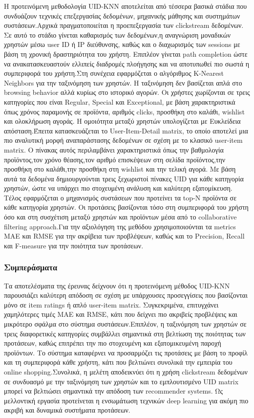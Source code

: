 \documentclass[12pt,a4paper]{article}
\begin{document}
	Η προτεινόμενη μεθοδολογία UID-KNN αποτελείται από τέσσερα βασικά στάδια που συνδυάζουν τεχνικές επεξεργασίας δεδομένων, μηχανικής μάθησης και συστημάτων συστάσεων.Αρχικά πραγματοποιείται η προεπεξεργασία των clickstream δεδομένων. Σε αυτό το στάδιο γίνεται καθαρισμός των δεδομένων,η αναγνώριση μοναδικών χρηστών μέσω user ID ή IP διεύθυνσης, καθώς και ο διαχωρισμός των sessions με βάση τη χρονική δραστηριότητα του χρήστη. Επιπλέον γίνεται path completion ώστε να ανακατασκευαστούν ελλιπείς διαδρομές πλοήγησης και να αποτυπωθεί πιο σωστά η συμπεριφορά του χρήστη.Στη συνέχεια εφαρμόζεται ο αλγόριθμος K-Nearest Neighbors για την ταξινόμηση των χρηστών. Η ταξινόμηση δεν βασίζεται απλά στο browsing behavior αλλά κυρίως στο ιστορικό αγορών. Οι χρήστες χωρίζονται σε τρεις κατηγορίες που είναι Regular, Special και Exceptional, με βάση χαρακτηριστικά όπως χρόνος παραμονής σε προϊόντα, αριθμός clicks, προσθήκη στο καλάθι, wishlist και ολοκλήρωση αγοράς. Η ομοιότητα μεταξύ χρηστών υπολογίζεται με Ευκλείδεια απόσταση.Έπειτα κατασκευάζεται το User-Item-Detail matrix, το οποίο αποτελεί μια πιο αναλυτική μορφή αναπαράστασης δεδομένων σε σχέση με το κλασικό user-item matrix. Ο πίνακας αυτός περιλαμβάνει χαρακτηριστικά όπως την βαθμολογία προϊόντος,τον χρόνο θέασης,τον αριθμό επισκέψεων στη σελίδα προϊόντος,την προσθήκη στο καλάθι,την προσθήκη στη wishlist και την τελική αγορά. Με βάση αυτά τα δεδομένα δημιουργούνται τρεις ξεχωριστοί πίνακες UID για κάθε κατηγορία χρηστών, ώστε να υπάρχει πιο στοχευμένη ανάλυση και καλύτερη εξατομίκευση.
	Τέλος εφαρμόζεται ο μηχανισμός συστάσεων που προτείνει τα top-N προϊόντα σε κάθε κατηγορία χρηστών. Οι προτάσεις βασίζονται τόσο στη συμπεριφορά του χρήστη όσο και στη συσχέτιση μεταξύ χρηστών και προϊόντων μέσα από το collaborative filtering approach.Για την αξιολόγηση της μεθόδου χρησιμοποιούνται τα metrics MAE και RMSE για την ακρίβεια των προβλέψεων, καθώς και το Precision, Recall και F-measure για την ποιότητα των προτάσεων.
    
	\subsubsection{Συμπεράσματα}
	Τα αποτελέσματα της έρευνας δείχνουν ότι η προτεινόμενη μέθοδος UID-KNN παρουσιάζει καλύτερη απόδοση σε σχέση με υπάρχουσες προσεγγίσεις που βασίζονται μόνο σε item ratings ή απλό user-item matrix. Συγκεκριμένα, επιτυγχάνει χαμηλότερες τιμές MAE και RMSE, κάτι που δείχνει πιο ακριβείς προβλέψεις και μικρότερο σφάλμα στο σύστημα συστάσεων.Επιπλέον, η ταξινόμηση των χρηστών σε τρεις διαφορετικές κατηγορίες συμβάλλει σημαντικά στη βελτίωση της ποιότητας των προτάσεων, καθώς επιτρέπει την πιο στοχευμένη και εξατομικευμένη παροχή προϊόντων. Το σύστημα καταφέρνει να προσαρμόζει τις προτάσεις με βάση το προφίλ και τη συμπεριφορά κάθε χρήστη, κάτι που βελτιώνει συνολικά την εμπειρία του online shopping.Συνολικά, η μελέτη αποδεικνύει ότι η χρήση clickstream δεδομένων σε συνδυασμό με την ταξινόμηση των χρηστών και το εμπλουτισμένο UID matrix μπορεί να βελτιώσει σημαντικά την απόδοση των recommender systems. Ως μελλοντική εργασία προτείνεται η ενσωμάτωση τεχνικών deep learning για ακόμη πιο ακριβή και δυναμικά συστήματα προτάσεων.
	
\end{document}
